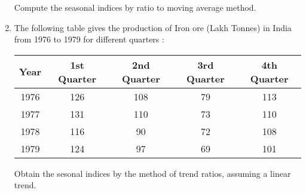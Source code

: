 \documentclass[11pt, a4paper]{article}
\begin{document}
\begin{enumerate}
	
	Compute the seasonal indices by ratio to moving average method. 









































	\item The following table gives the production of Iron ore (Lakh Tonnes) in India from 1976 to 1979 for different quarters :
	
	\begin{table}[h]
	\def\arraystertch{1.5}
	
	\begin{center}
	\begin{tabular}{|c||c|c|c|c|}
	
	\hline
	
	Year & 1st Quarter & 2nd Quarter & 3rd Quarter & 4th Quarter \\
	
	\hline
	
	1976 & 126 & 108 & 79 & 113 \\
	
	1977 & 131 & 110 & 73 & 110 \\
	
	1978 & 116 & 90 & 72 & 108 \\
	
	1979 & 124 & 97 & 69 & 101 \\
	
	\hline
	
	\end{tabular}
	\end{center}
	
	\end{table}
	
	Obtain the sesonal indices by the method of trend ratios, assuming a linear trend.
	
	
	

\end{enumerate}
\end{document}
